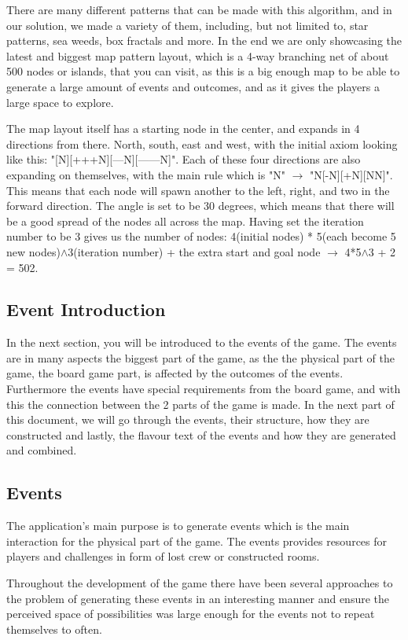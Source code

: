 There are many different patterns that can be made with this algorithm, and in our solution, we made a variety of them, including, but not limited to, star patterns, sea weeds, box fractals and more. 
In the end we are only showcasing the latest and biggest map pattern layout, which is a 4-way branching net of about 500 nodes or islands, that you can visit, as this is a big enough map to be able to generate a large amount of events and outcomes, and as it gives the players a large space to explore.

The map layout itself has a starting node in the center, and expands in 4 directions from there. North, south, east and west, with the initial axiom looking like this: "[N][+++N][---N][------N]". Each of these four directions are also expanding on themselves, with the main rule which is "N" $\rightarrow$ "N[-N][+N][NN]". This means that each node will spawn another to the left, right, and two in the forward direction. The angle is set to be 30 degrees, which means that there will be a good spread of the nodes all across the map. Having set the iteration number to be 3 gives us the number of nodes: 4(initial nodes) * 5(each become 5 new nodes)$\wedge$3(iteration number) + the extra start and goal node $\rightarrow$ 4*5$\wedge$3 + 2 = 502.

\subsection{Event Introduction}
In the next section, you will be introduced to the events of the game. The events are in many aspects the biggest part of the game, as the the physical part of the game, the board game part, is affected by the outcomes of the events. Furthermore the events have special requirements from the board game, and with this the connection between the 2 parts of the game is made.
In the next part of this document, we will go through the events, their structure, how they are constructed and lastly, the flavour text of the events and how they are generated and combined.

\subsection{Events}
\label{sec:eve}
The application's main purpose is to generate events which is the main interaction for the physical part of the game. The events provides resources for players and challenges in form of lost crew or constructed rooms.

Throughout the development of the game there have been several approaches to the problem of generating these events in an interesting manner and ensure the perceived space of possibilities was large enough for the events not to repeat themselves to often.

